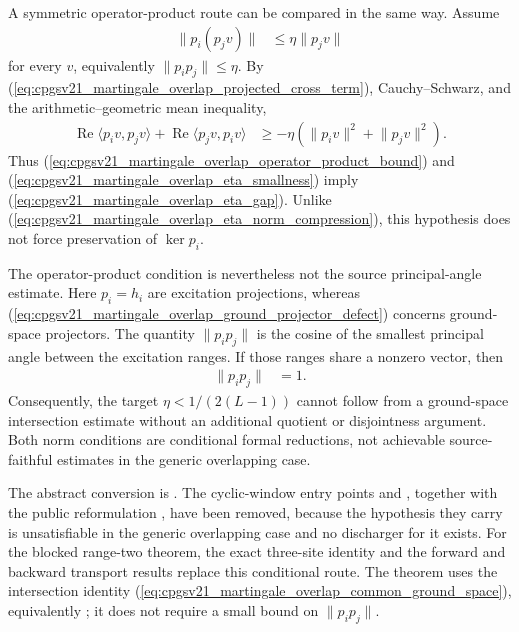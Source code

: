 \documentclass{article}
\begin{document}
A symmetric operator-product route can be compared in the same way. Assume
\begin{align}
    \lVert p_i(p_jv)\rVert
     & \leq\eta\lVert p_jv\rVert
    \label{eq:cpgsv21_martingale_overlap_operator_product_bound}
\end{align}
for every $v$, equivalently $\lVert p_ip_j\rVert\leq\eta$. By
(\ref{eq:cpgsv21_martingale_overlap_projected_cross_term}),
Cauchy--Schwarz, and the arithmetic--geometric mean inequality,
\begin{align}
    \operatorname{Re}\langle p_iv,p_jv\rangle +\operatorname{Re}\langle p_jv,p_iv\rangle
     & \geq
    -\eta(\lVert p_iv\rVert^2+\lVert p_jv\rVert^2).
    \label{eq:cpgsv21_martingale_overlap_operator_product_anticommutator}
\end{align}
Thus
(\ref{eq:cpgsv21_martingale_overlap_operator_product_bound}) and
(\ref{eq:cpgsv21_martingale_overlap_eta_smallness}) imply
(\ref{eq:cpgsv21_martingale_overlap_eta_gap}). Unlike
(\ref{eq:cpgsv21_martingale_overlap_eta_norm_compression}), this hypothesis
does not force preservation of $\ker p_i$.

The operator-product condition is nevertheless not the source principal-angle
estimate. Here $p_i=h_i$ are excitation projections, whereas
(\ref{eq:cpgsv21_martingale_overlap_ground_projector_defect}) concerns
ground-space projectors. The quantity $\lVert p_ip_j\rVert$ is the cosine of
the smallest principal angle between the excitation ranges. If those ranges
share a nonzero vector, then
\begin{align}
    \lVert p_ip_j\rVert
     & =1.
    \label{eq:cpgsv21_martingale_overlap_excitation_product_unit_norm}
\end{align}
Consequently, the target $\eta<1/(2(L-1))$ cannot follow from a ground-space
intersection estimate without an additional quotient or disjointness
argument. Both norm conditions are conditional formal reductions, not
achievable source-faithful estimates in the generic overlapping case.

The abstract conversion is
.
The cyclic-window entry points
and
,
together with the public reformulation
,
have been removed, because the hypothesis they carry is unsatisfiable in the
generic overlapping case and no discharger for it exists. For the
blocked range-two theorem, the exact three-site identity and the forward and
backward transport results replace this conditional route. The theorem
uses the intersection identity
(\ref{eq:cpgsv21_martingale_overlap_common_ground_space}), equivalently
; it does not
require a small bound on $\lVert p_ip_j\rVert$.
\end{document}
